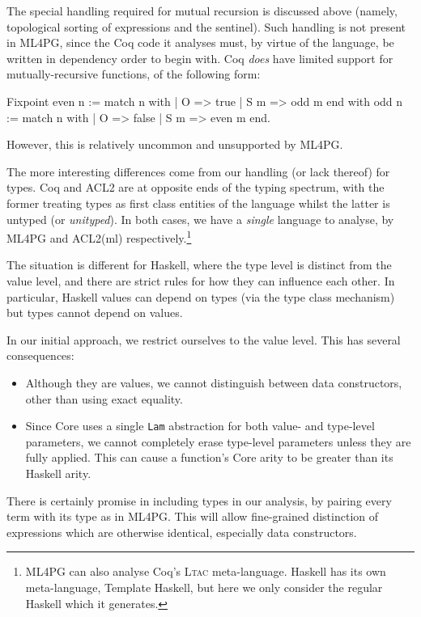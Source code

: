 The special handling required for mutual recursion is discussed above (namely, topological sorting of expressions and the  sentinel). Such handling is not present in ML4PG, since the Coq code it analyses must, by virtue of the language, be written in dependency order to begin with. Coq \emph{does} have limited support for mutually-recursive functions, of the following form:

\begin{coqblock}
Fixpoint even n := match n with
                       | O   => true
                       | S m => odd m
                   end
    with odd  n := match n with
                       | O   => false
                       | S m => even m
                   end.
\end{coqblock}

However, this is relatively uncommon and unsupported by ML4PG.

The more interesting differences come from our handling (or lack thereof) for types. Coq and ACL2 are at opposite ends of the typing spectrum, with the former treating types as first class entities of the language whilst the latter is untyped (or \emph{unityped}). In both cases, we have a \emph{single} language to analyse, by ML4PG and ACL2(ml) respectively.\footnote{ML4PG can also analyse Coq's \textsc{Ltac} meta-language. Haskell has its own meta-language, Template Haskell, but here we only consider the regular Haskell which it generates.}

The situation is different for Haskell, where the type level is distinct from the value level, and there are strict rules for how they can influence each other. In particular, Haskell values can depend on types (via the type class mechanism) but types cannot depend on values.

In our initial approach, we restrict ourselves to the value level. This has several consequences:

\begin{itemize}
  \item Although they are values, we cannot distinguish between data constructors, other than using exact equality.
  \item Since Core uses a single \texttt{Lam} abstraction for both value- and type-level parameters, we cannot completely erase type-level parameters unless they are fully applied. This can cause a function's Core arity to be greater than its Haskell arity.
\end{itemize}

There is certainly promise in including types in our analysis, by pairing every term with its type as in ML4PG. This will allow fine-grained distinction of expressions which are otherwise identical, especially data constructors.
